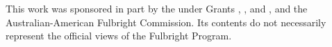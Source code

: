 \documentclass[sigconf]{style/acmart}
\begin{document}


\begin{acks}
This work was sponsored in part by the  under Grants , , and , and the Australian-American Fulbright Commission. Its contents do not necessarily represent the official views of the Fulbright Program.
\end{acks}



 \label{bibliography}


\end{document}
